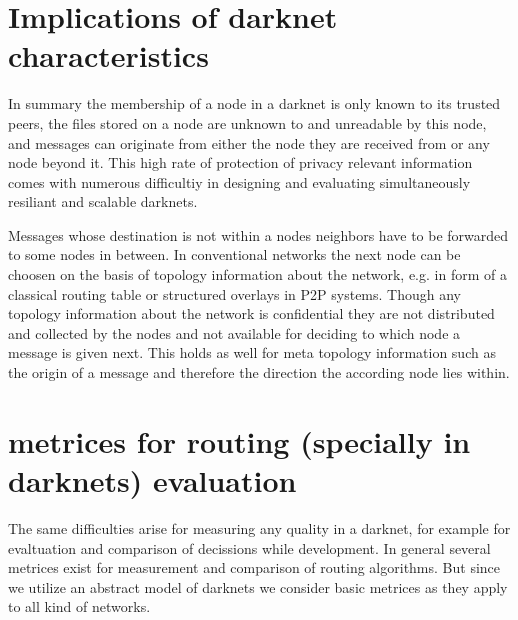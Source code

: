 \section{Implications of darknet characteristics}

In summary the membership of a node in a darknet is only known to its trusted peers, the files stored on a node are unknown to and unreadable by this node, and messages can originate from either the node they are received from or any node beyond it. This high rate of protection of privacy relevant information comes with numerous difficultiy in designing and evaluating simultaneously resiliant and scalable darknets.

Messages whose destination is not within a nodes neighbors have to be forwarded to some nodes in between. In conventional networks the next node can be choosen on the basis of topology information about the network, e.g. in form of a classical routing table or structured overlays in P2P systems. Though any topology information about the network is confidential they are not distributed and collected by the nodes and not available for deciding to which node a message is given next. This holds as well for meta topology information such as the origin of a message and therefore the direction the according node lies within.

\section{metrices for routing (specially in darknets) evaluation}

The same difficulties arise for measuring any quality in a darknet, for example for evaltuation and comparison of decissions while development. In general several metrices exist for measurement and comparison of routing algorithms. But since we utilize an abstract model of darknets we consider basic metrices as they apply to all kind of networks.

